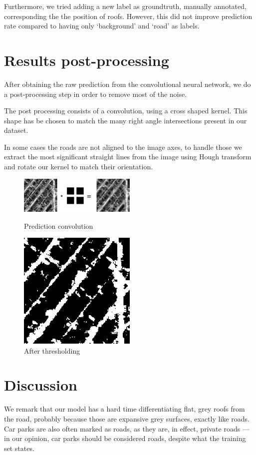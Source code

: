 \documentclass[11pt,conference,compsocconf]{IEEEtran}
\begin{document}
Furthermore, we tried adding a new label as groundtruth, manually annotated, corresponding the the position of roofs. However, this did not improve prediction rate compared to having only `background' and `road' as labels.


\section{Results post-processing}
After obtaining the raw prediction from the convolutional neural network, we do a post-processing step in order to remove most of the noise.

The post processing consists of a convolution, using a cross shaped kernel. This shape has be chosen to match the many right angle intersections present in our dataset.


In some cases the roads are not aligned to the image axes, to handle those we extract the most significant straight lines from the image using Hough transform and rotate our kernel to match their orientation.

\begin{figure}[h]
\includegraphics[width=0.5\textwidth]{conv.png}
\caption{Prediction convolution}
\includegraphics[width=0.5\textwidth]{50_final_mask.png}
\caption{After thresholding}
\end{figure}

\section{Discussion}
We remark that our model has a hard time differentiating flat, grey roofs from the road, probably because those are expansive grey surfaces, exactly like roads. Car parks are also often marked as roads, as they are, in effect, private roads --- in our opinion, car parks should be considered roads, despite what the training set states.
\end{document}
